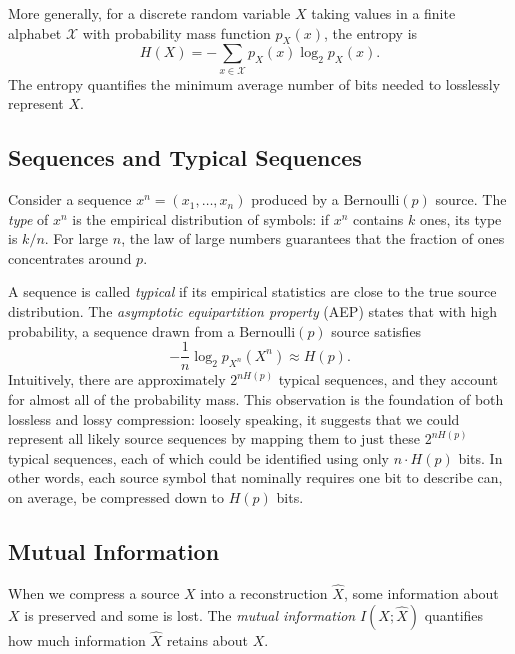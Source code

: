 \documentclass[11pt]{article}
\newcommand{\Hp}{H(p)}
\newcommand{\Ber}{\mathrm{Bernoulli}}
\newcommand{\calX}{\mathcal{X}}
\begin{document}
More generally, for a discrete random variable $X$ taking values in a finite
alphabet $\calX$ with probability mass function $p_X(x)$, the entropy is
\begin{equation}
\label{eq:entropy_general}
H(X) = -\sum_{x \in \calX} p_X(x) \log_2 p_X(x).
\end{equation}
The entropy quantifies the minimum average number of bits needed to losslessly
represent $X$.

\subsection{Sequences and Typical Sequences}
\label{subsec:typical}

Consider a sequence $x^n = (x_1, \ldots, x_n)$ produced by a $\Ber(p)$ source.
The \emph{type} of $x^n$ is the empirical distribution of symbols: if $x^n$
contains $k$ ones, its type is $k/n$.
For large $n$, the law of large numbers guarantees that the fraction of ones
concentrates around $p$.

A sequence is called \emph{typical} if its empirical statistics are close to
the true source distribution.
The \emph{asymptotic equipartition property} (AEP) states that with high
probability, a sequence drawn from a $\Ber(p)$ source satisfies
\begin{equation}
-\frac{1}{n} \log_2 p_{X^n}(X^n) \approx \Hp.
\end{equation}
Intuitively, there are approximately $2^{n\Hp}$ typical sequences, and they
account for almost all of the probability mass.
This observation is the foundation of both lossless and lossy compression:
loosely speaking, it suggests that we could represent all likely source sequences
by mapping them to just these $2^{n\Hp}$ typical sequences, each of which could
be identified using only $n \cdot \Hp$ bits.
In other words, each source symbol that nominally requires one bit to describe
can, on average, be compressed down to $\Hp$ bits.

\subsection{Mutual Information}
\label{subsec:mutual_info}

When we compress a source $X$ into a reconstruction $\hat{X}$, some information
about $X$ is preserved and some is lost.
The \emph{mutual information} $I(X; \hat{X})$ quantifies how much information
$\hat{X}$ retains about $X$.
\end{document}
